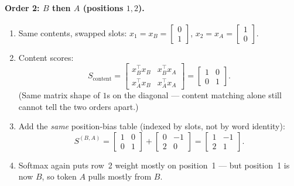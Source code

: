 \documentclass[11pt]{article}
\begin{document}
\paragraph{Order 2: \(B\) then \(A\) (positions \(1,2\)).}
\begin{enumerate}[leftmargin=*]
  \item Same contents, swapped slots:
        \(x_1=x_B=\begin{bmatrix}0\\1\end{bmatrix}\),
        \(x_2=x_A=\begin{bmatrix}1\\0\end{bmatrix}\).
  \item Content scores:
        \[
          S_{\text{content}}
          =
          \begin{bmatrix}
            x_B^\top x_B & x_B^\top x_A \\
            x_A^\top x_B & x_A^\top x_A
          \end{bmatrix}
          =
          \begin{bmatrix}1&0\\0&1\end{bmatrix}.
        \]
        (Same matrix shape of \(1\)s on the diagonal --- content matching
        alone still cannot tell the two orders apart.)
  \item Add the \emph{same} position-bias table (indexed by slots, not by
        word identity):
        \[
          S^{(B,A)}
          =
          \begin{bmatrix}1&0\\0&1\end{bmatrix}
          +
          \begin{bmatrix}0&-1\\2&0\end{bmatrix}
          =
          \begin{bmatrix}1&-1\\2&1\end{bmatrix}.
        \]
  \item Softmax again puts row~2 weight mostly on position~1 --- but
        position~1 is now \(B\), so token \(A\) pulls mostly from \(B\).
\end{enumerate}
\end{document}
